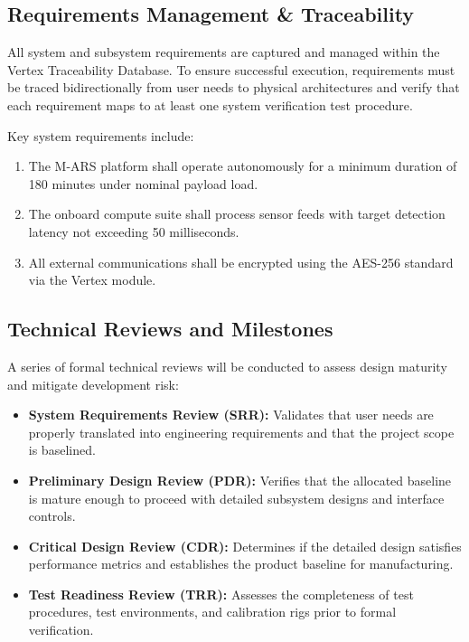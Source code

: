 \subsection{Requirements Management \& Traceability}
All system and subsystem requirements are captured and managed within the Vertex Traceability Database. To ensure successful execution, requirements must be traced bidirectionally from user needs to physical architectures and verify that each requirement maps to at least one system verification test procedure.

Key system requirements include:
\begin{enumerate}[label=\lbrack REQ-\arabic*\rbrack, noitemsep, topsep=3pt]
  \item The M-ARS platform shall operate autonomously for a minimum duration of 180 minutes under nominal payload load.
  \item The onboard compute suite shall process sensor feeds with target detection latency not exceeding 50 milliseconds.
  \item All external communications shall be encrypted using the AES-256 standard via the Vertex module.
\end{enumerate}

\subsection{Technical Reviews and Milestones}
A series of formal technical reviews will be conducted to assess design maturity and mitigate development risk:
\begin{itemize}[noitemsep, topsep=3pt]
  \item \textbf{System Requirements Review (SRR):} Validates that user needs are properly translated into engineering requirements and that the project scope is baselined.
  \item \textbf{Preliminary Design Review (PDR):} Verifies that the allocated baseline is mature enough to proceed with detailed subsystem designs and interface controls.
  \item \textbf{Critical Design Review (CDR):} Determines if the detailed design satisfies performance metrics and establishes the product baseline for manufacturing.
  \item \textbf{Test Readiness Review (TRR):} Assesses the completeness of test procedures, test environments, and calibration rigs prior to formal verification.
\end{itemize}

